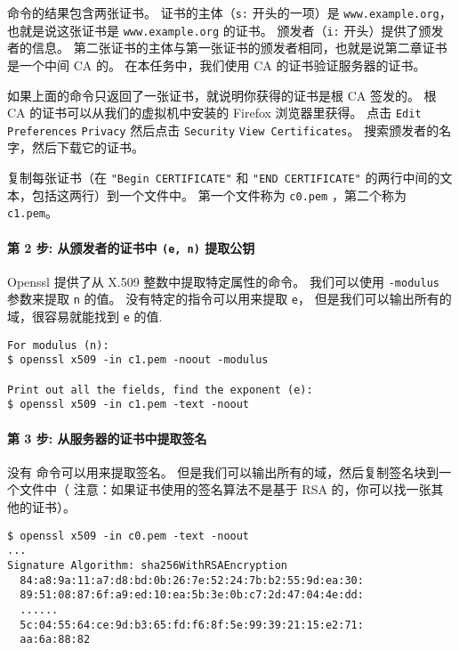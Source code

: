 命令的结果包含两张证书。
证书的主体（\texttt{s:} 开头的一项）是 \texttt{www.example.org}，
也就是说这张证书是 \texttt{www.example.org} 的证书。
颁发者（\texttt{i:} 开头）提供了颁发者的信息。
第二张证书的主体与第一张证书的颁发者相同，也就是说第二章证书是一个中间 CA 的。
在本任务中，我们使用 CA 的证书验证服务器的证书。

如果上面的命令只返回了一张证书，就说明你获得的证书是根 CA 签发的。
根 CA 的证书可以从我们的虚拟机中安装的 Firefox 浏览器里获得。
点击 \texttt{Edit}  \texttt{Preferences}
 \texttt{Privacy}  然后点击
\texttt{Security}  \texttt{View Certificates}。
搜索颁发者的名字，然后下载它的证书。

复制每张证书（在 \texttt{"Begin CERTIFICATE"} 和
\texttt{"END CERTIFICATE"} 的两行中间的文本，包括这两行）到一个文件中。
第一个文件称为 \texttt{c0.pem} ，第二个称为 \texttt{c1.pem}。


\paragraph{第 2 步: 从颁发者的证书中 \texttt{(e, n)} 提取公钥}
Openssl 提供了从 X.509 整数中提取特定属性的命令。
我们可以使用 \texttt{-modulus} 参数来提取 \texttt{n} 的值。
没有特定的指令可以用来提取 \texttt{e}，
但是我们可以输出所有的域，很容易就能找到 \texttt{e} 的值.

\begin{lstlisting}
For modulus (n):
$ openssl x509 -in c1.pem -noout -modulus

Print out all the fields, find the exponent (e):
$ openssl x509 -in c1.pem -text -noout
\end{lstlisting}


\paragraph{第 3 步: 从服务器的证书中提取签名}
没有 \openssl 命令可以用来提取签名。
但是我们可以输出所有的域，然后复制签名块到一个文件中（
注意：如果证书使用的签名算法不是基于 RSA 的，你可以找一张其他的证书）。

\begin{lstlisting}
$ openssl x509 -in c0.pem -text -noout
...
Signature Algorithm: sha256WithRSAEncryption
  84:a8:9a:11:a7:d8:bd:0b:26:7e:52:24:7b:b2:55:9d:ea:30:
  89:51:08:87:6f:a9:ed:10:ea:5b:3e:0b:c7:2d:47:04:4e:dd:
  ......
  5c:04:55:64:ce:9d:b3:65:fd:f6:8f:5e:99:39:21:15:e2:71:
  aa:6a:88:82
\end{lstlisting}

